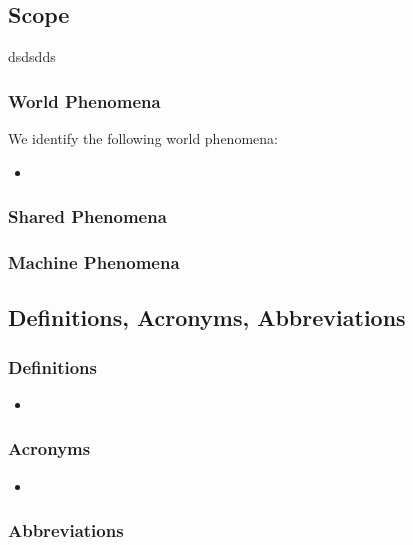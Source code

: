 \documentclass {article}
\begin{document}
	\subsection{Scope}
	dsdsdds
	\\		
		\subsubsection{World Phenomena}
		
We identify the following world phenomena:
		\begin{itemize}
			\item 			
		\end{itemize}

		\subsubsection{Shared Phenomena}
		
		\subsubsection{Machine Phenomena}


	\subsection{Definitions, Acronyms, Abbreviations}
					
		\subsubsection{Definitions}
			
			\begin{itemize}
				\item 				
			\end{itemize}
		
		\subsubsection{Acronyms}
		
			\begin{itemize}
				\item 
			\end{itemize}

				
				
		\subsubsection{Abbreviations}
			
\end{document}
